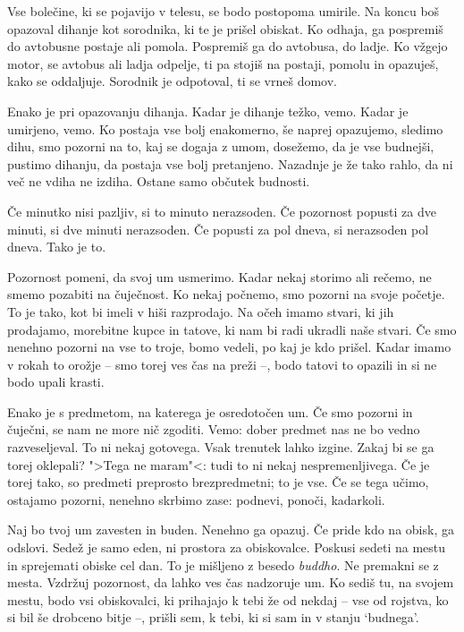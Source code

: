 Vse bolečine, ki se pojavijo v telesu, se bodo postopoma umirile. Na koncu boš opazoval dihanje kot sorodnika, ki te je prišel obiskat. Ko odhaja, ga pospremiš do avtobusne postaje ali pomola. Pospremiš ga do avtobusa, do ladje. Ko vžgejo motor, se avtobus ali ladja odpelje, ti pa stojiš na postaji, pomolu in opazuješ, kako se oddaljuje. Sorodnik je odpotoval, ti se vrneš domov.

Enako je pri opazovanju dihanja. Kadar je dihanje težko, vemo. Kadar je umirjeno, vemo. Ko postaja vse bolj enakomerno, še naprej opazujemo, sledimo dihu, smo pozorni na to, kaj se dogaja z umom, dosežemo, da je vse budnejši, pustimo dihanju, da postaja vse bolj pretanjeno. Nazadnje je že tako rahlo, da ni več ne vdiha ne izdiha. Ostane samo občutek budnosti.

\clearpage


Če minutko nisi pazljiv, si to minuto nerazsoden. Če pozornost popusti za dve minuti, si dve minuti nerazsoden. Če popusti za pol dneva, si nerazsoden pol dneva. Tako je to.

Pozornost pomeni, da svoj um usmerimo. Kadar nekaj storimo ali rečemo, ne smemo pozabiti na čuječnost. Ko nekaj počnemo, smo pozorni na svoje početje. To je tako, kot bi imeli v hiši razprodajo. Na očeh imamo stvari, ki jih prodajamo, morebitne kupce in tatove, ki nam bi radi ukradli naše stvari. Če smo nenehno pozorni na vse to troje, bomo vedeli, po kaj je kdo prišel. Kadar imamo v rokah to orožje – smo torej ves čas na preži –, bodo tatovi to opazili in si ne bodo upali krasti.

Enako je s predmetom, na katerega je osredotočen um. Če smo pozorni in čuječni, se nam ne more nič zgoditi. Vemo: dober predmet nas ne bo vedno razveseljeval. To ni nekaj gotovega. Vsak trenutek lahko izgine. Zakaj bi se ga torej oklepali? ">Tega ne maram"<: tudi to ni nekaj nespremenljivega. Če je torej tako, so predmeti preprosto brezpredmetni; to je vse. Če se tega učimo, ostajamo pozorni, nenehno skrbimo zase: podnevi, ponoči, kadarkoli.

\clearpage


Naj bo tvoj um zavesten in buden. Nenehno ga opazuj. Če pride kdo na obisk, ga odslovi. Sedež je samo eden, ni prostora za obiskovalce. Poskusi sedeti na mestu in sprejemati obiske cel dan. To je mišljeno z besedo \emph{buddho}. Ne premakni se z mesta. Vzdržuj pozornost, da lahko ves čas nadzoruje um. Ko sediš tu, na svojem mestu, bodo vsi obiskovalci, ki prihajajo k tebi že od nekdaj – vse od rojstva, ko si bil še drobceno bitje –, prišli sem, k tebi, ki si sam in v stanju `budnega'.


